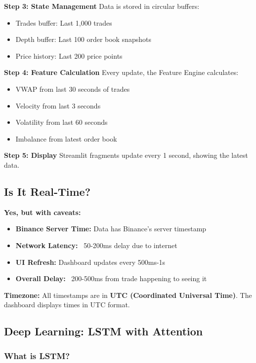 \documentclass[12pt,a4paper]{article}
\begin{document}
\textbf{Step 3: State Management}
Data is stored in circular buffers:
\begin{itemize}
    \item Trades buffer: Last 1,000 trades
    \item Depth buffer: Last 100 order book snapshots
    \item Price history: Last 200 price points
\end{itemize}

\textbf{Step 4: Feature Calculation}
Every update, the Feature Engine calculates:
\begin{itemize}
    \item VWAP from last 30 seconds of trades
    \item Velocity from last 3 seconds
    \item Volatility from last 60 seconds
    \item Imbalance from latest order book
\end{itemize}

\textbf{Step 5: Display}
Streamlit fragments update every 1 second, showing the latest data.

\subsection{Is It Real-Time?}

\textbf{Yes, but with caveats:}
\begin{itemize}
    \item \textbf{Binance Server Time:} Data has Binance's server timestamp
    \item \textbf{Network Latency:} ~50-200ms delay due to internet
    \item \textbf{UI Refresh:} Dashboard updates every 500ms-1s
    \item \textbf{Overall Delay:} ~200-500ms from trade happening to seeing it
\end{itemize}

\textbf{Timezone:}
All timestamps are in \textbf{UTC (Coordinated Universal Time)}. The dashboard displays times in UTC format.

\subsection{Deep Learning: LSTM with Attention}

\subsubsection{What is LSTM?}
\end{document}
